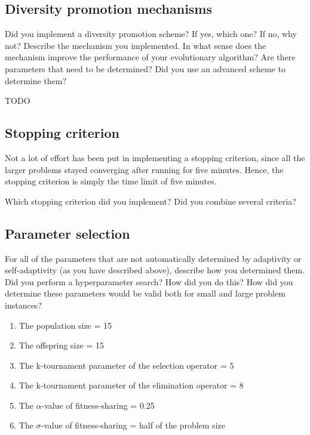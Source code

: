 \documentclass[a4paper,10pt]{article}
\newcommand{\ReplaceMe}[1]{{\color{blue}#1}}
\begin{document}
\subsection{Diversity promotion mechanisms}
\label{diversity_promotion}
\ReplaceMe{Did you implement a diversity promotion scheme? If yes, which one? If no, why not? Describe the mechanism you implemented. In what sense does the mechanism improve the performance of your evolutionary algorithm? Are there parameters that need to be determined? Did you use an advanced scheme to determine them?}

\begin{algorithm}
\begin{algorithmic}
\label{fitness_sharing_algorithm}
\State TODO
\end{algorithmic}
\end{algorithm}

\subsection{Stopping criterion}
Not a lot of effort has been put in implementing a stopping criterion, since all the larger problems stayed converging after running for five minutes. Hence, the stopping criterion is simply the time limit of five minutes.

\ReplaceMe{Which stopping criterion did you implement? Did you combine several criteria?}

\subsection{Parameter selection}

\ReplaceMe{For all of the parameters that are not automatically determined by adaptivity or self-adaptivity (as you have described above), describe how you determined them. Did you perform a hyperparameter search? How did you do this? How did you determine these parameters would be valid both for small and large problem instances?}

\begin{enumerate}
    \item The population size = 15
    \item The offspring size = 15
    \item The k-tournament parameter of the selection operator = 5 
    \item The k-tournament parameter of the elimination operator = 8
    \item The $\alpha$-value of fitness-sharing = 0.25
    \item The $\sigma$-value of fitness-sharing = half of the problem size
\end{enumerate}
\end{document}
